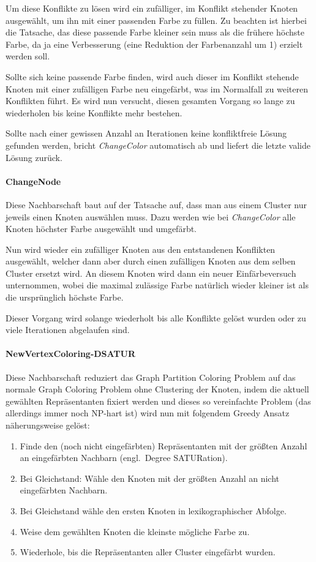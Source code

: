 \documentclass[paper=a4,fontsize=12pt]{scrartcl}
\begin{document}
Um diese Konflikte zu lösen wird ein zufälliger, im Konflikt stehender Knoten ausgewählt, um ihn mit einer passenden Farbe zu füllen. Zu beachten ist hierbei die Tatsache, das diese passende Farbe kleiner sein muss als die frühere höchste Farbe, da ja eine Verbesserung (eine Reduktion der Farbenanzahl um 1) erzielt werden soll.

Sollte sich keine passende Farbe finden, wird auch dieser im Konflikt stehende Knoten mit einer zufälligen Farbe neu eingefärbt, was im Normalfall zu weiteren Konflikten führt. Es wird nun versucht, diesen gesamten Vorgang so lange zu wiederholen bis keine Konflikte mehr bestehen. 

Sollte nach einer gewissen Anzahl an Iterationen keine konfliktfreie Lösung gefunden werden, bricht \emph{ChangeColor} automatisch ab und liefert die letzte valide Lösung zurück.

\paragraph{ChangeNode}
Diese Nachbarschaft baut auf der Tatsache auf, dass man aus einem Cluster nur jeweils einen Knoten auswählen muss. Dazu werden wie bei \emph{ChangeColor} alle Knoten höchster Farbe ausgewählt und umgefärbt.

Nun wird wieder ein zufälliger Knoten aus den entstandenen Konflikten ausgewählt, welcher dann aber durch einen zufälligen Knoten aus dem selben Cluster ersetzt wird. An diesem Knoten wird dann ein neuer Einfärbeversuch unternommen, wobei die maximal zulässige Farbe natürlich wieder kleiner ist als die ursprünglich höchste Farbe.

Dieser Vorgang wird solange wiederholt bis alle Konflikte gelöst wurden oder zu viele Iterationen abgelaufen sind.

\paragraph{NewVertexColoring-DSATUR}
Diese Nachbarschaft reduziert das Graph Partition Coloring Problem auf das normale Graph Coloring Problem ohne Clustering der Knoten, indem die aktuell gewählten Repräsentanten fixiert werden und dieses so vereinfachte Problem (das allerdings immer noch NP-hart ist) wird nun mit folgendem Greedy Ansatz näherungsweise gelöst:

\begin{enumerate}
    \item Finde den (noch nicht eingefärbten) Repräsentanten mit der größten Anzahl an eingefärbten Nachbarn (engl.\ Degree SATURation).
    \item Bei Gleichstand: Wähle den Knoten mit der größten Anzahl an nicht eingefärbten Nachbarn.
    \item Bei Gleichstand wähle den ersten Knoten in lexikographischer Abfolge.
    \item Weise dem gewählten Knoten die kleinste mögliche Farbe zu.
    \item Wiederhole, bis die Repräsentanten aller Cluster eingefärbt wurden.
\end{enumerate}
\end{document}
